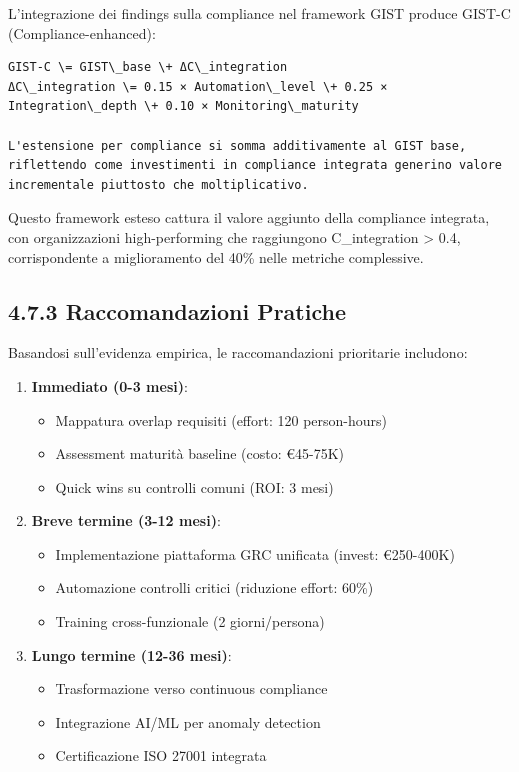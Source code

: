 \documentclass[12pt,a4paper,oneside]{book}
\providecommand{\tightlist}{%
  \setlength{\itemsep}{0pt}\setlength{\parskip}{0pt}
}
\numberwithin{figure}{chapter} %
\numberwithin{table}{chapter}  %
\begin{document}
L'integrazione dei findings sulla compliance nel framework GIST produce
GIST-C (Compliance-enhanced):

\begin{verbatim}
GIST-C \= GIST\_base \+ ΔC\_integration  
ΔC\_integration \= 0.15 × Automation\_level \+ 0.25 × Integration\_depth \+ 0.10 × Monitoring\_maturity

L'estensione per compliance si somma additivamente al GIST base, riflettendo come investimenti in compliance integrata generino valore incrementale piuttosto che moltiplicativo.
\end{verbatim}

Questo framework esteso cattura il valore aggiunto della compliance
integrata, con organizzazioni high-performing che raggiungono
C\_integration \textgreater{} 0.4, corrispondente a miglioramento del
40\% nelle metriche complessive.

\subsection{4.7.3 Raccomandazioni
Pratiche}\label{raccomandazioni-pratiche}

Basandosi sull'evidenza empirica, le raccomandazioni prioritarie
includono:

\begin{enumerate}
\def\labelenumi{\arabic{enumi}.}
\tightlist
\item
  \textbf{Immediato (0-3 mesi)}:

  \begin{itemize}
  \tightlist
  \item
    Mappatura overlap requisiti (effort: 120 person-hours)
  \item
    Assessment maturità baseline (costo: €45-75K)
  \item
    Quick wins su controlli comuni (ROI: 3 mesi)
  \end{itemize}
\item
  \textbf{Breve termine (3-12 mesi)}:

  \begin{itemize}
  \tightlist
  \item
    Implementazione piattaforma GRC unificata (invest: €250-400K)
  \item
    Automazione controlli critici (riduzione effort: 60\%)
  \item
    Training cross-funzionale (2 giorni/persona)
  \end{itemize}
\item
  \textbf{Lungo termine (12-36 mesi)}:

  \begin{itemize}
  \tightlist
  \item
    Trasformazione verso continuous compliance
  \item
    Integrazione AI/ML per anomaly detection
  \item
    Certificazione ISO 27001 integrata
  \end{itemize}
\end{enumerate}
\end{document}
